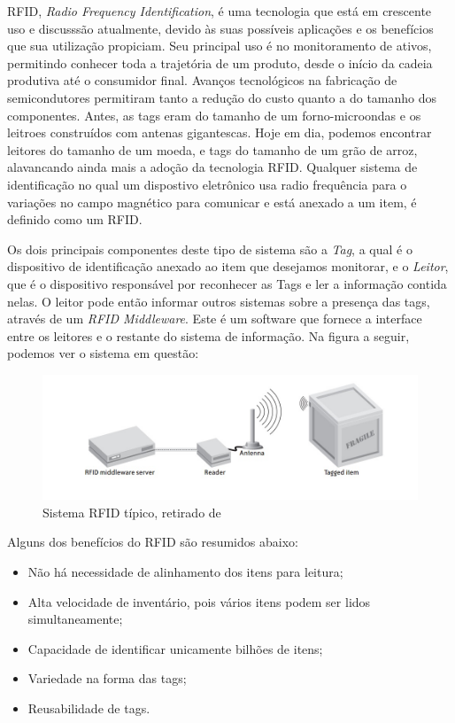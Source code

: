 \documentclass[a4paper,12pt,titlepage]{article}
\begin{document}
	
	RFID, \textit{Radio Frequency Identification}, é uma tecnologia que está em crescente uso e discusssão atualmente, devido às suas possíveis aplicações e os benefícios que sua utilização propiciam. Seu principal uso é no monitoramento de ativos, permitindo conhecer toda a trajetória de um produto, desde o início da cadeia produtiva até o consumidor final. Avanços tecnológicos na fabricação de semicondutores permitiram tanto a redução do custo quanto a do tamanho dos componentes. Antes, as tags eram do tamanho de um forno-microondas e os leitroes construídos com antenas gigantescas. Hoje em dia, podemos encontrar leitores do tamanho de um moeda, e tags do tamanho de um grão de arroz, alavancando ainda mais a adoção da tecnologia RFID. Qualquer sistema de identificação no qual um dispostivo eletrônico usa radio frequência para o variações no campo magnético para comunicar e está anexado a um item, é definido como um RFID.
	
	Os dois principais componentes deste tipo de sistema são a \textit{Tag}, a qual é o dispositivo de identificação anexado ao item que desejamos monitorar, e o \textit{Leitor}, que é o dispositivo responsável por reconhecer as Tags e ler a informação contida nelas. O leitor pode então informar outros sistemas sobre a presença das tags, através de um \textit{RFID Middleware}. Este é um software que fornece a interface entre os leitores e o restante do sistema de informação. Na figura a seguir, podemos ver o sistema em questão:
	
	\begin{figure}[h!]
		\centering
		\includegraphics[width=0.6\linewidth]{rfidsys2}
		\caption{Sistema RFID típico, retirado de \cite{rfidbook}}
		\label{fig:rfidsys}
	\end{figure}
	
	Alguns dos benefícios do RFID são resumidos abaixo:
	\begin{itemize}
		\item Não há necessidade de alinhamento dos itens para leitura;
		\item Alta velocidade de inventário, pois vários itens podem ser lidos simultaneamente;
		\item Capacidade de identificar unicamente bilhões de itens;
		\item Variedade na forma das tags;
		\item Reusabilidade de tags.
	\end{itemize}
	
\end{document}
